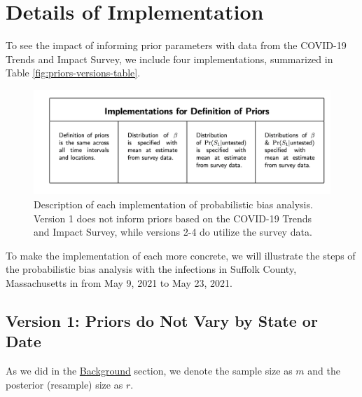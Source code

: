 \documentclass[12pt,twoside]{smiththesis}
\begin{document}
\hypertarget{details-of-implementation}{%
\chapter{Details of Implementation}\label{details-of-implementation}}

To see the impact of informing prior parameters with data from the COVID-19 Trends and Impact Survey, we include four implementations, summarized in Table \ref{fig:priors-versions-table}.
\begin{figure}
\includegraphics[width=1\linewidth]{figure/priors_implementations} \caption{\label{fig:priors-versions-table}Description of each implementation of probabilistic bias analysis. Version 1 does not inform priors based on the COVID-19 Trends and Impact Survey, while versions 2-4 do utilize the survey data.}\label{fig:unnamed-chunk-53}
\end{figure}
To make the implementation of each more concrete, we will illustrate the steps of the probabilistic bias analysis with the infections in Suffolk County, Massachusetts in from May 9, 2021 to May 23, 2021.

\newpage

\hypertarget{version-1-priors-do-not-vary-by-state-or-date}{%
\section{Version 1: Priors do Not Vary by State or Date}\label{version-1-priors-do-not-vary-by-state-or-date}}

As we did in the \protect\hyperlink{sampling}{Background} section, we denote the sample size as \(m\) and the posterior (resample) size as \(r\).
\end{document}
